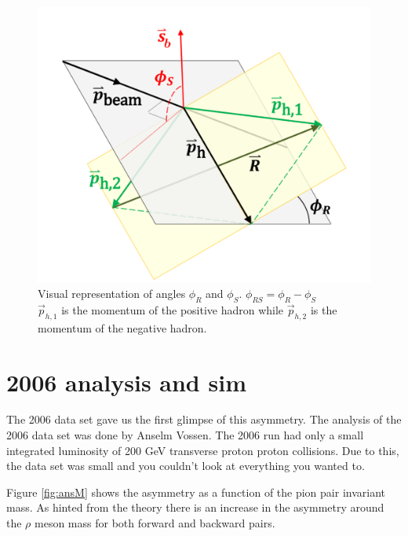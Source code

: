 \documentclass[abstract = on,listof=totoc, bibliography=totoc]{scrreprt}
\newcommand{\phir}{\phi_{R}}
\newcommand{\phis}{\phi_{S}}
\begin{document}
\begin{figure}
\begin{center}
\includegraphics[width = 1\textwidth]{IFF_frame_edit2}
\caption[Angles $\phis$ and $\phir$]{Visual representation of angles $\phi_R$ and $\phi_S$. $\phi_{RS} = \phi_R - \phi_S$ \\ $\vec{p}_{h,1}$ is the momentum of the positive hadron while  $\vec{p}_{h,2}$ is the momentum of the negative hadron.}
\label{fig:angleDeff}
\end{center}
\end{figure}




\chapter{2006 analysis and sim}
\label{chap:2006}

The 2006 data set gave us the first glimpse of this asymmetry. The analysis of the 2006 data set was done by Anselm Vossen. The 2006 run had only a small integrated luminosity of 200 GeV transverse proton proton collisions. Due to this, the data set was small and you couldn't look at everything you wanted to. 


Figure \ref{fig:ansM} shows the asymmetry as a function of the pion pair invariant mass. As hinted from the theory there is an increase in the asymmetry around the $\rho$ meson mass for both forward and backward pairs. 
\end{document}

